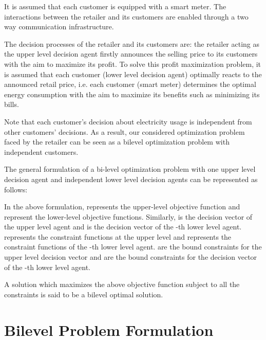 \documentclass[10pt,journal]{IEEEtran}
\theoremstyle{definition}
\theoremstyle{plain} \newtheorem{theo}{Theorem} \newtheorem{prop}{Proposition}  \newtheorem{lemm}{Lemma}
\begin{document}
It is assumed that each customer is equipped with a smart meter. The interactions between the retailer and its customers are enabled through a two way communication infrastructure. 



The decision processes of the retailer and its customers are: the retailer acting as the upper level decision agent firstly announces the selling price to its customers with the aim to maximize its profit. To solve this profit maximization problem, it is assumed that each customer (lower level decision agent) optimally reacts to the announced retail price, i.e. each customer (smart meter) determines the optimal energy consumption with the aim to maximize its benefits such as minimizing its bills.



Note that each customer's decision about electricity usage is independent from other customers' decisions. As a result, our considered optimization problem faced by the retailer can be seen as a bilevel optimization problem with independent customers.





The general formulation of a bi-level optimization problem with one upper level decision agent and  independent lower level decision agents can be represented as follows: 





In the above formulation,  represents the upper-level objective function and  represent the lower-level objective functions. Similarly,  is the decision vector of the upper level agent and  is the decision vector of the -th lower level agent.  represents the constraint functions at the upper level and  represents the constraint functions of the -th lower level agent.   are the bound constraints for the upper level decision vector and  are the bound constraints for the decision vector of the -th lower level agent.

A solution  which maximizes the above objective function  subject to all the constraints is said to be a bilevel optimal solution. 








\section{Bilevel Problem Formulation} \label{problem formulation}
\end{document}

